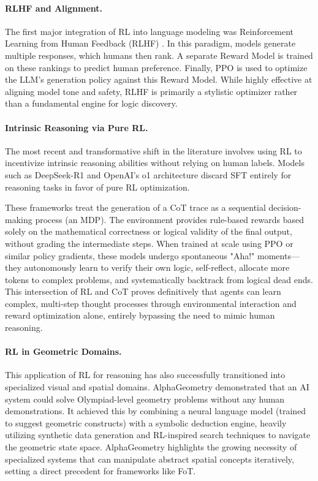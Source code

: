 \documentclass{l4proj}
\begin{document}
\paragraph{RLHF and Alignment.}
The first major integration of RL into language modeling was Reinforcement Learning from Human Feedback (RLHF) \citep{ouyang2022training}. In this paradigm, models generate multiple responses, which humans then rank. A separate Reward Model is trained on these rankings to predict human preference. Finally, PPO is used to optimize the LLM's generation policy against this Reward Model. While highly effective at aligning model tone and safety, RLHF is primarily a stylistic optimizer rather than a fundamental engine for logic discovery.

\paragraph{Intrinsic Reasoning via Pure RL.}
The most recent and transformative shift in the literature involves using RL to incentivize intrinsic reasoning abilities without relying on human labels. Models such as DeepSeek-R1 \citep{deepseek2025deepseekr1} and OpenAI's o1 architecture \citep{openai2024o1} discard SFT entirely for reasoning tasks in favor of pure RL optimization.

These frameworks treat the generation of a CoT trace as a sequential decision-making process (an MDP). The environment provides rule-based rewards based solely on the mathematical correctness or logical validity of the final output, without grading the intermediate steps. When trained at scale using PPO or similar policy gradients, these models undergo spontaneous "Aha!" moments—they autonomously learn to verify their own logic, self-reflect, allocate more tokens to complex problems, and systematically backtrack from logical dead ends. This intersection of RL and CoT proves definitively that agents can learn complex, multi-step thought processes through environmental interaction and reward optimization alone, entirely bypassing the need to mimic human reasoning.

\paragraph{RL in Geometric Domains.}
This application of RL for reasoning has also successfully transitioned into specialized visual and spatial domains. AlphaGeometry \citep{trinh2024solving} demonstrated that an AI system could solve Olympiad-level geometry problems without any human demonstrations. It achieved this by combining a neural language model (trained to suggest geometric constructs) with a symbolic deduction engine, heavily utilizing synthetic data generation and RL-inspired search techniques to navigate the geometric state space. AlphaGeometry highlights the growing necessity of specialized systems that can manipulate abstract spatial concepts iteratively, setting a direct precedent for frameworks like FoT.
\end{document}
